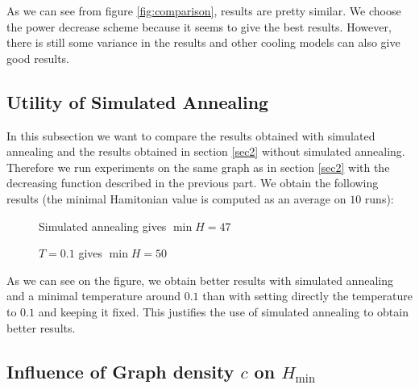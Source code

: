 \documentclass[a4paper]{article}
\begin{document}
As we can see from figure \ref{fig:comparison}, results are pretty similar. We choose the power decrease scheme because it seems to give the best results. However, there is still some variance in the results and other cooling models can also give good results.

\subsection{Utility of Simulated Annealing}

In this subsection we want to compare the results obtained with simulated annealing and the results obtained in section \ref{sec2} without simulated annealing. Therefore we run experiments on the same graph as in section \ref{sec2} with the decreasing function described in the previous part. We obtain the following results (the minimal Hamitonian value is computed as an average on $10$ runs):

\begin{figure}[H]
 \begin{minipage}[b]{.45\linewidth}
  \centering{}
  \caption{Simulated annealing gives $\min H=47$ \label{sim}}
 \end{minipage} \hfill
 \begin{minipage}[b]{.45\linewidth}
  \centering{}
  \caption{$T=0.1$ gives $\min H=50$ \label{fix01bis}}
 \end{minipage}
\end{figure}


As we can see on the figure, we obtain better results with simulated annealing and a minimal temperature around $0.1$ than with setting directly the temperature to $0.1$ and keeping it fixed. This justifies the use of simulated annealing to obtain better results.

\subsection{Influence of Graph density $c$ on $H_{\min}$}



\end{document}
